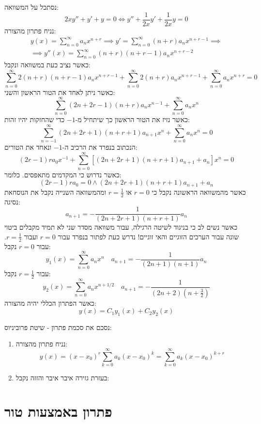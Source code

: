 \documentclass{tstextbook}
\begin{document}
\begin{example}
נסתכל על המשוואה:
$$2xy''+y'+y=0\iff y''+\frac{1}{2x}y'+\frac{1}{2x}y=0$$
נניח פתרון מהצורה:
\begin{gather*}y(x)=\sum_{n=0}^{\infty} a_{n}x^{n+r}\implies y'=\sum_{n=0}^{\infty} (n+r)a_{n}x^{n+r-1}\implies \\\implies y''(x)=\sum_{n=0}^{\infty} (n+r)(n+r-1)a_{n}x^{n+r-2} 
\end{gather*}
כאשר נציב כעת במשוואה ונקבל:
$$\sum_{n=0}^{\infty}2(n+r)(n+r-1)a_{n}x^{n+r-1}+\sum_{n=0}^{\infty}2(n+r)a_{n}x^{n+r-1}+ \sum_{n=0}^{\infty} a_{n}x^{n+r}=0$$
כאשר ניתן לאחד את הטור הראשון והשני:
$$\sum_{n=0}^{\infty} (2n+2r-1)(n+r)a_{n}x^{n-1}+\sum_{n=0}^{\infty} a_{n}x^{n}$$
כאשר נזיז את הטור הראשון כך שיתחיל מ-\(-1\) כדי שהחזקות יהיו זהות:
$$\sum_{n=-1}^{\infty} (2n+2r+1)(n+r+1)a_{n+1}x^{n}+\sum_{n=0}^{\infty} a_{n}x^{n}=0  $$
הנכתוב בנפרד את הרכיב ה-\(-1\) ונאחד את הטורים:
$$(2r-1)ra_{0}x^{-1}+\sum_{n=0}^{\infty}[(2n+2r+1)(n+r+1)a_{n+1}+a_{n}]x^{n}=0$$
כאשר נדרוש כי המקדמים מתאפסים. כלומר:
$$(2r-1)ra_{0}=0\land (2n+2r+1)(n+r+1)a_{n+1}+a_{n}$$
כאשר מהמשוואה הראשונה נקבל כי \(r=0\) או \(r=\frac{1}{2}\) ומהמשוואה השנייה נקבל את הנוסחאת נסיגה:
$$a_{n+1}=-\frac{1}{(2n+2r+1)(n+r+1)}a_{n}$$
כאשר נשים לב כי בניגוד לשיטה הרגילה, עבור משוואה מסדר שני לא תמיד מקבלים ביטוי שונה עבור הערכים הזוגיים והאי זוגיים! נדרש כעת לפתור בנפרד עבור \(r=0\) ועבור \(r=\frac{1}{2}\). עבור \(r=0\) נקבל:
$$y_{1}(x)=\sum_{n=0}^{\infty}a_{n}x^{n}\quad a_{n+1}= -\frac{1}{(2n+1)(n+1)}a_{n}$$
עבור \(r=\frac{1}{2}\) נקבל:
$$y_{2}(x)=\sum_{n=0}^{\infty} a_{n}x^{n+1/2}\quad a_{n+1}=- \frac{1}{(2n+2)\left( n+\frac{3}{2} \right)}$$
כאשר הפתרון הכללי יהיה מהצורה:
$$y(x)=C_{1}y_{1}(x)+C_{2}y_{2}(x)$$

\end{example}
נסכם את סכמת פתרון - שיטת פרוביניוס:

\begin{enumerate}
  \item נניח פתרון מהצורה: 
$$y(x)=(x-x_{0})^{r}\sum_{k=0}^{\infty}a_{k}(x-x_{0})^{k}=\sum_{k=0}^{\infty}a_{k}(x-x_{0})^{k+r}$$


  \item בעזרת גזירה איבר איבר והזזה נקבל: 


\end{enumerate}
\section{פתרון באמצעות טור}
\end{document}
